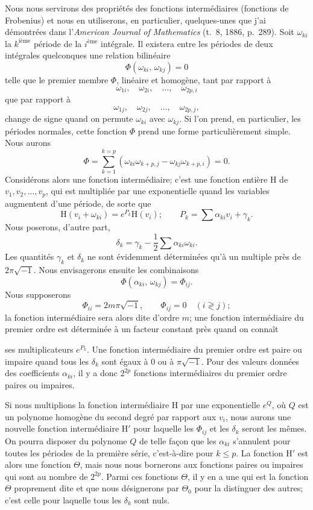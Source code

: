 \documentclass{article}
\begin{document}
Nous nous servirons des propriétés des fonctions intermédiaires (fonctions de Frobenius) et nous en utiliserons, en particulier, quelques-unes que j'ai démontrées dans l'\emph{American Journal of Mathematics} (t.~8, 1886, p.~289). Soit $\omega_{ki}$ la $k^{\text{ième}}$ période de la $i^{\text{ème}}$ intégrale. Il existera entre les périodes de deux intégrales quelconques une relation bilinéaire
\[
\Phi(\omega_{ki},\, \omega_{kj}) = 0 \tag{4}
\]
telle que le premier membre $\Phi$, linéaire et homogène, tant par rapport à
\[
\omega_{1i}, \quad \omega_{2i}, \quad \ldots, \quad \omega_{2p, i}
\]
que par rapport à
\[
\omega_{1j}, \quad \omega_{2j}, \quad \ldots, \quad \omega_{2p, j},
\]
change de signe quand on permute $\omega_{ki}$ avec $\omega_{kj}$. Si l'on prend, en particulier, les périodes normales, cette fonction $\Phi$ prend une forme particulièrement simple. Nous aurons
\[
\Phi = \sum_{k=1}^{k=p} (\omega_{ki} \omega_{k+p, j} - \omega_{kj} \omega_{k+p, i}) = 0. \tag{4~bis}
\]
Considérons alors une fonction intermédiaire; c'est une fonction entière $\mathrm{H}$ de $v_{1}, v_{2}, \ldots, v_{p}$, qui est multipliée par une exponentielle quand les variables augmentent d'une période, de sorte que
\[
\mathrm{H}(v_{i} + \omega_{ki}) = e^{P_{k}} \mathrm{H}(v_{i}); \qquad P_{k} = \sum \alpha_{ki} v_{i} + \gamma_{k}.
\]
Nous poserons, d'autre part,
\[
\delta_{k} = \gamma_{k} - \frac{1}{2} \sum \alpha_{ki} \omega_{ki}.
\]
Les quantités $\gamma_{k}$ et $\delta_{k}$ ne sont évidemment déterminées qu'à un multiple près de $2\pi\sqrt{-1}$. Nous envisagerons ensuite les combinaisons
\[
\Phi(\alpha_{ki},\, \omega_{kj}) = \Phi_{ij}.
\]
Nous supposerons
\[
\Phi_{ii} = 2m\pi\sqrt{-1}, \qquad \Phi_{ij} = 0 \quad (i \gtrless j); \tag{5}
\]
la fonction intermédiaire sera alors dite d'ordre $m$; une fonction intermédiaire du premier ordre est déterminée à un facteur constant près quand on connaît

ses multiplicateurs $e^{P_{k}}$. Une fonction intermédiaire du premier ordre est paire ou impaire quand tous les $\delta_{k}$ sont égaux à 0 ou à $\pi\sqrt{-1}$. Pour des valeurs données des coefficients $\alpha_{ki}$, il y a donc $2^{2p}$ fonctions intermédiaires du premier ordre paires ou impaires.

Si nous multiplions la fonction intermédiaire $\mathrm{H}$ par une exponentielle $e^{Q}$, où $Q$ est un polynome homogène du second degré par rapport aux $v_{i}$, nous aurons une nouvelle fonction intermédiaire $\mathrm{H}'$ pour laquelle les $\Phi_{ij}$ et les $\delta_{k}$ seront les mêmes. On pourra disposer du polynome $Q$ de telle façon que les $\alpha_{ki}$ s'annulent pour toutes les périodes de la première série, c'est-à-dire pour $k \le p$. La fonction $\mathrm{H}'$ est alors une fonction $\Theta$, mais nous nous bornerons aux fonctions paires ou impaires qui sont au nombre de $2^{2p}$. Parmi ces fonctions $\Theta$, il y en a une qui est la fonction $\Theta$ proprement dite et que nous désignerons par $\Theta_{0}$ pour la distinguer des autres; c'est celle pour laquelle tous les $\delta_{k}$ sont nuls.
\end{document}
